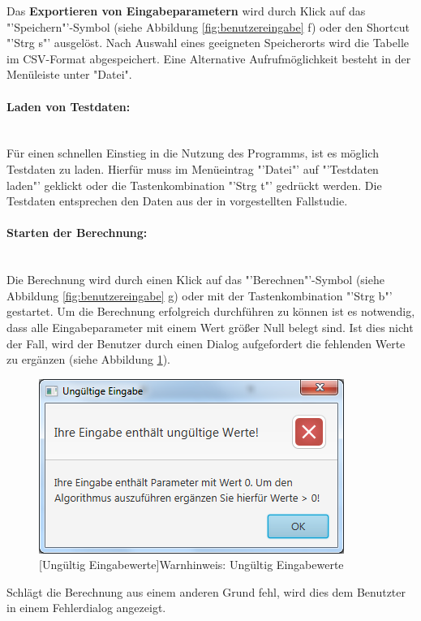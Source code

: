 Das \textbf{Exportieren von Eingabeparametern} wird durch Klick auf das "'Speichern"'-Symbol (siehe Abbildung \ref{fig:benutzereingabe} f) oder den Shortcut "'Strg s"' ausgelöst. Nach Auswahl eines geeigneten Speicherorts wird die Tabelle im CSV-Format abgespeichert. Eine Alternative Aufrufmöglichkeit besteht in der Menüleiste unter "Datei".

\paragraph{Laden von Testdaten:}~\\
Für einen schnellen Einstieg in die Nutzung des Programms, ist es möglich Testdaten zu laden. Hierfür muss im Menüeintrag "'Datei"' auf "'Testdaten laden"' geklickt oder die Tastenkombination "'Strg t"' gedrückt werden. Die Testdaten entsprechen den Daten aus der in \cite{Templ09} vorgestellten Fallstudie.

\paragraph{Starten der Berechnung:}~\\
Die Berechnung wird durch einen Klick auf das "'Berechnen"'-Symbol (siehe Abbildung \ref{fig:benutzereingabe} g) oder mit der Tastenkombination "'Strg b"' gestartet. Um die Berechnung erfolgreich durchführen zu können ist es notwendig, dass alle Eingabeparameter mit einem Wert größer Null belegt sind. Ist dies nicht der Fall, wird der Benutzer durch einen Dialog aufgefordert die fehlenden Werte zu ergänzen (siehe Abbildung \ref{fig:ungueltigewerte}). 

\begin{figure}[H]
	\centering
	\includegraphics[width=0.5\linewidth]{Bilder/UngueltigeWerte.png} 
	[Ungültig Eingabewerte]{Warnhinweis: Ungültig Eingabewerte}
	\label{fig:ungueltigewerte}
\end{figure}

Schlägt die Berechnung aus einem anderen Grund fehl, wird dies dem Benutzter in einem
Fehlerdialog angezeigt.

